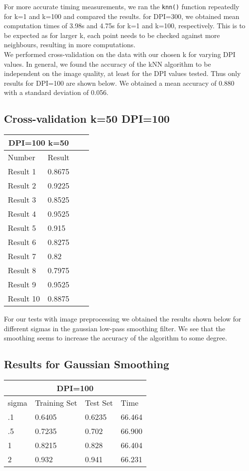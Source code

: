 \documentclass[paper=a4, fontsize=11pt]{scrartcl} %
\numberwithin{equation}{section} %
\numberwithin{figure}{section} %
\numberwithin{table}{section} %
\begin{document}
For more accurate timing measurements, we ran the \texttt{knn()} function repeatedly for k=1 and k=100 and compared the results. for DPI=300, we obtained mean computation times of 3.98s and 4.75s for k=1 and k=100, respectively. This is to be expected as for larger k, each point needs to be checked against more neighbours, resulting in more computations.\\

We performed cross-validation on the data with our chosen k for varying DPI values. In general, we found the accuracy of the kNN algorithm to be independent on the image quality, at least for the DPI values tested. Thus only results for DPI=100 are shown below. We obtained a mean accuracy of 0.880 with a standard deviation of 0.056.\\
\subsection*{Cross-validation k=50 DPI=100}
\begin{center}
\begin{tabular}{ |p{3cm}|p{3cm}|p{3cm}|p{3cm}|  }
 \hline
 \multicolumn{2}{|c|}{DPI=100 k=50} \\
 \hline
 Number & Result\\
 \hline
 Result 1 & 0.8675 \\
 Result 2 & 0.9225 \\
 Result 3 & 0.8525 \\
 Result 4 & 0.9525\\ 
 Result 5 & 0.915 \\
 Result 6 & 0.8275 \\
 Result 7 & 0.82 \\
 Result 8 & 0.7975 \\
 Result 9 & 0.9525 \\
 Result 10 & 0.8875\\
 \hline
\end{tabular}
\end{center}
\begin{center}
\end{center}

For our tests with image preprocessing we obtained the results shown below for different sigmas in the gaussian low-pass smoothing filter. We see that the smoothing seems to increase the accuracy of the algorithm to some degree.\\

\subsection*{Results for Gaussian Smoothing}
\begin{tabular}{ |p{3cm}|p{3cm}|p{3cm}|p{3cm}|  }
 \hline
 \multicolumn{4}{|c|}{DPI=100} \\
 \hline
 sigma & Training Set & Test Set & Time\\
 \hline
 .1 & 0.6405 & 0.6235 & 66.464\\
 .5 & 0.7235 & 0.702 & 66.900\\
 1 & 0.8215 & 0.828 & 66.404\\
 2 & 0.932 & 0.941 & 66.231\\
 \hline
\end{tabular}
\end{document}
